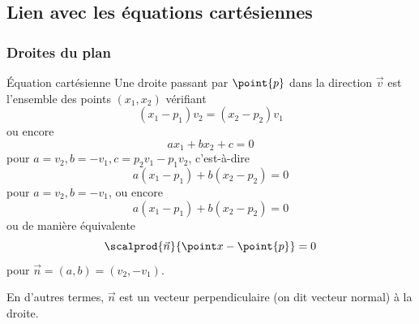 \documentclass[french,xcolor=svgnames]{beamer}
\begin{document}
\subsection{Lien avec les équations cartésiennes}
\subsubsection{Droites du plan}
\begin{frame}
\begin{block}{Équation cartésienne}
    Une droite passant par \(\point{p}\) dans la direction \(\vec v\) est l'ensemble des points \((x_{1},x_{2})\) vérifiant
    \begin{equation*}
      (x_{1}-p_{1})v_{2} = (x_{2}-p_{2})v_{1}
    \end{equation*}
    ou encore
    \begin{equation*}
      a x_{1} + b x_{2} + c = 0
    \end{equation*}
    pour \(a = v_{2}, b = -v_{1}, c = p_{2} v_{1} - p_{1} v_{2}\), c'est-à-dire
    \begin{equation*}
      a (x_{1} - p_{1}) + b (x_{2}-p_{2}) = 0
    \end{equation*}
    pour \(a = v_{2}, b = -v_{1}\), ou encore
    \begin{equation*}
      a (x_{1} - p_{1}) + b (x_{2}-p_{2}) = 0
    \end{equation*}
    ou de manière équivalente
    \begin{equation*}
      \scalprod{\vec n}{\point x - \point{p}} = 0
    \end{equation*}
    pour \(\vec{n} = (a,b) = (v_{2},-v_{1})\).

    En d'autres termes, \(\vec{n}\) est un vecteur perpendiculaire (on dit \og vecteur normal\fg{}) à la droite.
  \end{block}
 \end{frame}
\end{document}
